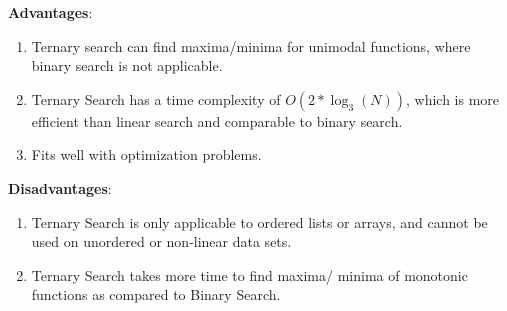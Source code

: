 \begin{table}[h]
    \begin{minipage}[t]{0.48\linewidth}
        \textbf{Advantages}:
        \begin{enumerate}
            \item Ternary search can find maxima/minima for unimodal functions, where binary search is not applicable.
            
            \item Ternary Search has a time complexity of $O(2 * \log_3(N))$, which is more efficient than linear search and comparable to binary search.

            \item Fits well with optimization problems.
        \end{enumerate}
    \end{minipage}
    \hfill
    \begin{minipage}[t]{0.48\linewidth}
        \textbf{Disadvantages}:
        \begin{enumerate}
            \item Ternary Search is only applicable to ordered lists or arrays, and cannot be used on unordered or non-linear data sets.

            \item Ternary Search takes more time to find maxima/ minima of monotonic functions as compared to Binary Search.
        \end{enumerate}
    \end{minipage}
\end{table}

